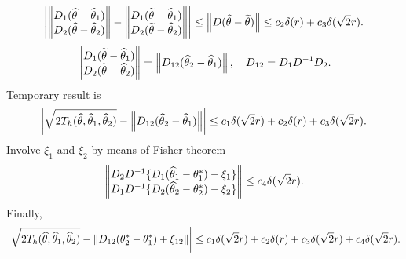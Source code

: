 \[
\left |
\left\Vert 
\begin{matrix}
D_1(\widehat{\theta} - \widehat{\theta}_1) \\
D_2(\widehat{\theta} - \widehat{\theta}_2) \\
\end{matrix} \right\Vert  - 
\left\Vert 
\begin{matrix}
D_1(\widetilde{\theta} - \widehat{\theta}_1) \\
D_2(\widetilde{\theta}  - \widehat{\theta}_2) \\
\end{matrix} \right\Vert
\right | 
\leq 
\left\Vert D (\widehat{\theta} - \widetilde{\theta}) \right\Vert 
\leq 
 c_2 \delta(r) +  c_3 \delta(\sqrt{2} r).
\]
\[
\left\Vert 
\begin{matrix}
D_1(\widetilde{\theta} - \widehat{\theta}_1) \\
D_2(\widetilde{\theta}  - \widehat{\theta}_2) \\
\end{matrix} \right\Vert  = 
\left\Vert D_{12} (\widehat{\theta}_2 - \widehat{\theta}_1) \right\Vert,
\quad D_{12} =  D_1 D^{-1} D_2.
\]
Temporary result is
\[
\left |
\sqrt{2 T_h(\widehat{\theta}, \widehat{\theta}_1, \widehat{\theta}_2)} - 
\left\Vert D_{12} (\widehat{\theta}_2 - \widehat{\theta}_1) \right\Vert
\right |
\leq c_1 \delta(\sqrt{2}r)  +  c_2 \delta(r) +  c_3 \delta(\sqrt{2} r).
\]
Involve $\xi_1$ and $\xi_2$  by means of Fisher theorem
\[
\left\Vert 
\begin{matrix}
D_2 D^{-1} \{ D_1(\widehat{\theta}_1 - \theta^*_1 ) - \xi_1 \} \\
D_1 D^{-1} \{ D_2(\widehat{\theta}_2 - \theta^*_2 ) - \xi_2 \} \\
\end{matrix} \right\Vert 
\leq
c_4 \delta(\sqrt{2} r).
\]
Finally,
\[
\left |
\sqrt{2 T_h(\widehat{\theta}, \widehat{\theta}_1, \widehat{\theta}_2)} - 
\left\Vert D_{12} (\theta^*_2 - \theta^*_1) + \xi_{12} \right\Vert
\right |
\leq c_1 \delta(\sqrt{2}r)  +  c_2 \delta(r) +  c_3 \delta(\sqrt{2} r) + c_4 \delta(\sqrt{2} r).
\]




